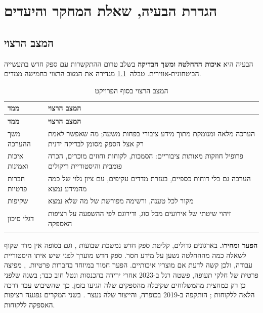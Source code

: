\chapter{הגדרת הבעיה, שאלת המחקר והיעדים}\label{ch:problem}

\section{המצב הרצוי}

הבעיה היא \textbf{איכות ההחלטה ומשך הבדיקה} בשלב טרום ההתקשרות עם ספק חדש בתעשייה הביטחונית-אווירית. טבלה~\ref{tab:goal} מגדירה את המצב הרצוי בחמישה ממדים.

{\small
\begin{longtable}{|>{\raggedright\arraybackslash}p{3.2cm}|>{\raggedright\arraybackslash}p{10.8cm}|}
\caption{המצב הרצוי בסוף הפרויקט}\label{tab:goal}\\
\hline
\textbf{ממד} & \textbf{המצב הרצוי} \\ \hline
\endfirsthead
\hline
\textbf{ממד} & \textbf{המצב הרצוי} \\ \hline
\endhead
משך ההערכה & הערכה מלאה ומנומקת מתוך מידע ציבורי בפחות משעה; מה שאפשר לאמת רק אצל הספק מסומן לבדיקה ידנית \\ \hline
איכות ואמינות & פרופיל חוזקות מאותות ציבוריים: הסמכות, לקוחות וחוזים מוכרים, הכרה פומבית והיסטוריית ריקולים \\ \hline
חברות פרטיות & הערכה גם בלי דוחות כספיים, בעזרת מדדים עקיפים, עם ציון גלוי של כמה מהמידע נמצא \\ \hline
שקיפות & מקור לכל טענה, ורשימה מפורשת של מה שלא נמצא \\ \hline
דגלי סיכון & זיהוי שיטתי של אירועים מכל סוג, ודירוגם לפי ההשפעה על רציפות האספקה \\* \hline
\end{longtable}
}

\textbf{הפער ומחירו.} בארגונים גדולים, קליטת ספק חדש נמשכת שבועות \cite{hicx2021}, וגם בסופה אין מדד שקוף לשאלה כמה מההחלטה נשען על מידע חסר. ספק חדש מוערך לפני שיש איתו היסטוריית עבודה, ולכן קשה לדעת אם מוצריו איכותיים. הפער חמור במיוחד בחברות פרטיות. , מפיצה פרטית של חלקי תעופה, פשטה רגל ב-2023 אחרי ירידה בהכנסות ונטל חוב כבד; בשנה שלפני כן רק כמחצית מהמשלוחים שקיבלה מהספקים שלה הגיעו בזמן, כך שהשיבוש עבר דרכה הלאה ללקוחות \cite{incora2023};  הותקפה ב-2019 בכופרה, והייצור שלה נעצר \cite{certeu2019}. בשני המקרים נפגעה רציפות האספקה ללקוחות.

